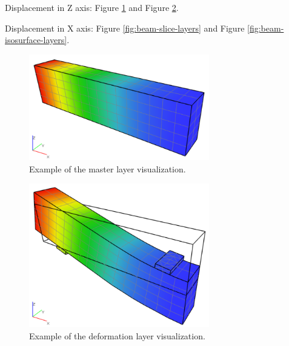 

Displacement in Z axis: Figure \ref{fig:beam-master-layer} and Figure \ref{fig:beam-deformation-layer}.

Displacement in X axis: Figure \ref{fig:beam-slice-layers} and Figure \ref{fig:beam-isosurface-layers}.

\begin{figure}[H]
    \centering
    \includegraphics[width=0.7\textwidth]{figures/chapter-data-management/beam-master-layer}
    \decoRule
    \caption{Example of the master layer visualization.}
    \label{fig:beam-master-layer}
\end{figure}

\begin{figure}[H]
    \centering
    \includegraphics[width=0.7\textwidth]{figures/chapter-data-management/beam-deformation-layer}
    \decoRule
    \caption{Example of the deformation layer visualization.}
    \label{fig:beam-deformation-layer}
\end{figure}


